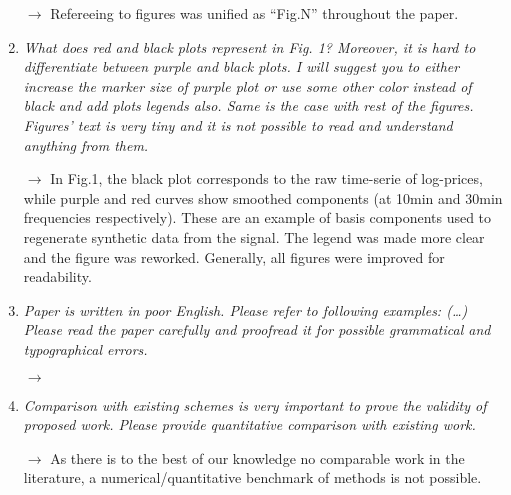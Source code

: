 \documentclass[11pt,a4paper,sans]{moderncv}        %
\begin{document}
\begin{enumerate}
	$\rightarrow$ Refereeing to figures was unified as ``Fig.N'' throughout the paper.
	
	\medskip
	
	\item \textit{What does red and black plots represent in Fig. 1? Moreover, it is hard to differentiate between purple and black plots. I will suggest you to either increase the marker size of purple plot or use some other color instead of black and add plots legends also. Same is the case with rest of the figures. Figures’ text is very tiny and it is not possible to read and understand anything from them.}

	$\rightarrow$ In Fig.1, the black plot corresponds to the raw time-serie of log-prices, while purple and red curves show smoothed components (at 10min and 30min frequencies respectively). These are an example of basis components used to regenerate synthetic data from the signal. The legend was made more clear and the figure was reworked. Generally, all figures were improved for readability.
	
	\medskip
	
	\item \textit{Paper is written in poor English. Please refer to following examples: (\ldots) Please read the paper carefully and proofread it for possible grammatical and typographical errors.} 

	$\rightarrow$

	\medskip

	\item \textit{Comparison with existing schemes is very important to prove the validity of proposed work. Please provide quantitative comparison with existing work.}
  
  	$\rightarrow$ As there is to the best of our knowledge no comparable work in the literature, a numerical/quantitative benchmark of methods is not possible. %
  	
\end{enumerate}
\end{document}
